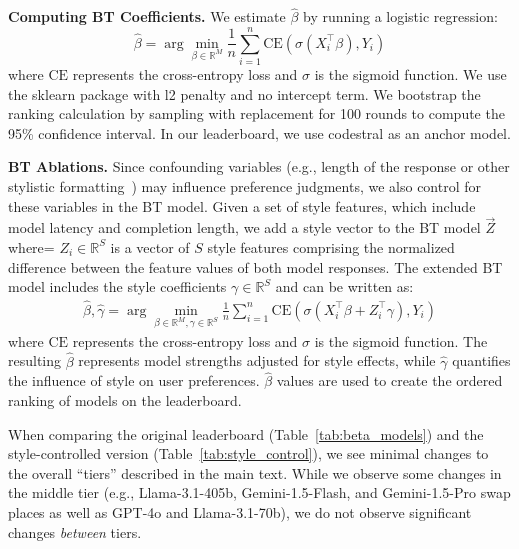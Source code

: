 \textbf{Computing BT Coefficients.} We estimate $\hat{\beta}$ by running a logistic regression:
\begin{equation}
\hat{\beta} = \arg \min_{\beta \in \mathbb{R}^M} \frac{1}{n}\sum\limits_{i=1}^n \text{CE}(\sigma(X_i^\top \beta), Y_i)
\end{equation}
where $\text{CE}$ represents the cross-entropy loss and $\sigma$ is the sigmoid function. 
We use the sklearn package with l2 penalty and no intercept term. 
We bootstrap the ranking calculation by sampling with replacement for 100 rounds to compute the 95\% confidence interval.
In our leaderboard, we use codestral as an anchor model.




\textbf{BT Ablations.} Since confounding variables (e.g., length of the response or other stylistic formatting~\cite{singhal2023long}) may influence preference judgments, we also control for these variables in the BT model.
Given a set of style features, which include model latency and completion length, we add a style vector to the BT model $\vec{Z}$ where=
$Z_i \in \mathbb{R}^S$ is a vector of $S$ style features comprising the normalized difference between the feature values of both model responses.
The extended BT model includes the style coefficients $\gamma \in \mathbb{R}^{S}$ and can be written as:
\begin{align*}
    \hat{\beta}, \hat{\gamma} = \arg \min_{\beta \in \mathbb{R}^M, \gamma \in \mathbb{R}^S} \frac{1}{n}\sum\limits_{i=1}^n \text{CE}(\sigma(X_i^\top \beta + Z_i^\top \gamma), Y_i)
\end{align*}
where $\text{CE}$ represents the cross-entropy loss and $\sigma$ is the sigmoid function. 
The resulting $\hat{\beta}$ represents model strengths adjusted for style effects, while $\hat{\gamma}$ quantifies the influence of style on user preferences.
$\hat{\beta}$ values are used to create the ordered ranking of models on the leaderboard.

When comparing the original leaderboard (Table~\ref{tab:beta_models}) and the style-controlled version (Table~\ref{tab:style_control}), we see minimal changes to the overall ``tiers'' described in the main text. While we observe some changes in the middle tier (e.g., Llama-3.1-405b, Gemini-1.5-Flash, and Gemini-1.5-Pro swap places as well as GPT-4o and Llama-3.1-70b), we do not observe significant changes \emph{between} tiers.

